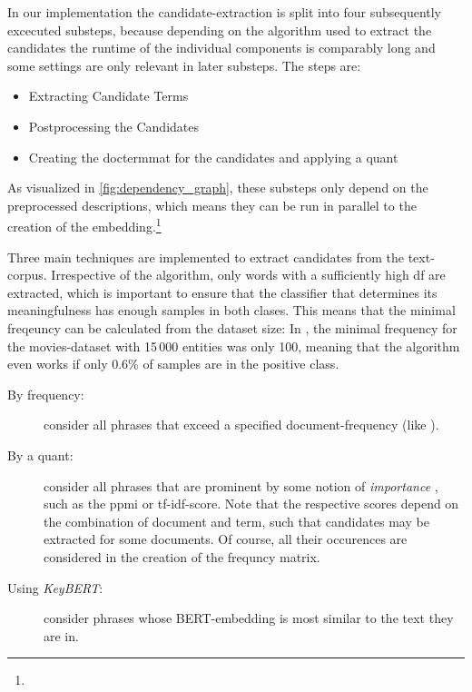 
In our implementation the candidate-extraction is split into four subsequently excecuted substeps, because depending on the algorithm used to extract the candidates the runtime of the individual components is comparably long and some settings are only relevant in later substeps. The steps are:
\begin{itemize}
	\item Extracting Candidate Terms
	\item Postprocessing the Candidates
	\item Creating the \gls{doctermmat} for the candidates and applying a \gls{quant}
\end{itemize}

As visualized in \autoref{fig:dependency_graph}, these substeps only depend on the preprocessed descriptions, which means they can be run in parallel to the creation of the embedding.\footnote{}

Three main techniques are implemented to extract candidates from the text-corpus. Irrespective of the algorithm, only words with a sufficiently high \gls{df} are extracted, which is important to ensure that the classifier that determines its meaningfulness has enough samples in both clases. This means that the minimal freqeuncy can be calculated from the dataset size: In \cite{Derrac2015}, the minimal frequency for the movies-dataset with 15\,000 entities was only 100, meaning that the algorithm even works if only 0.6\% of samples are in the positive class. 


\begin{description}
	\item[By frequency:] consider all phrases that exceed a specified document-frequency (like \cite{Derrac2015}).
	\item[By a \gls{quant}:] consider all phrases that are prominent by some notion of \textit{importance} , such as the \gls{ppmi} or \gls{tf-idf}-score. Note that the respective scores depend on the combination of document and term, such that candidates may be extracted for some documents. Of course, all their occurences are considered in the creation of the frequncy matrix.
	\item[Using \emph{KeyBERT}\cite{grootendorst2020keybert}:] consider phrases whose BERT-embedding \cite{Devlin2019} is most similar to the text they are in. 
\end{description}

